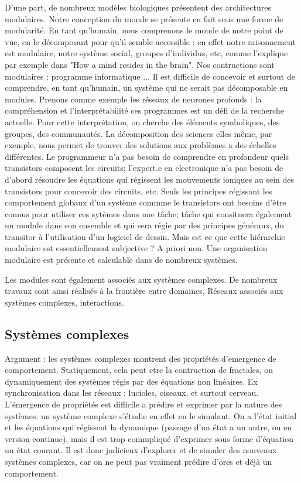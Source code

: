 D'une part, de nombreux modèles biologiques présentent des architectures modulaires. Notre conception du monde se présente en fait sous une forme de modularité. En tant qu'humain, nous comprenons le monde de notre point de vue, en le décomposant pour qu'il semble accessible : en effet notre raisonnement est modulaire, notre système social, groupes d'individus, etc, comme l'explique par exemple \cite{Morowitz1995TheMT} dans "How a mind resides in the brain".
Nos contructions sont modulaires : programme informatique ... Il est difficile de concevoir et surtout de comprendre, en tant qu'humain, un système qui ne serait pas décomposable en modules. Prenons comme exemple les réseaux de neurones profonds : la compréhension  et l'interprétabilité ces programmes est un défi de la recherche actuelle. Pour cette interprétation, on cherche des éléments symboliques, des groupes, des communautés. 
La décomposition des sciences elles même, par exemple, nous permet de trouver des solutions aux problèmes a des échelles différentes. Le programmeur n'a pas besoin de comprendre en profondeur quels transistors composent les circuits; l'expert.e en electronique n'a pas besoin de d'abord résoudre les équations qui régissent les mouvements ioniques au sein des transistors pour concevoir des circuits, etc. Seuls les principes régissant les comportement globaux d'un système commme le transistors ont besoins d'être connus pour utiliser ces sytèmes dans une tâche; tâche qui consituera également un module dans son ensemble et qui sera régie par des principes généraux, du transitor à l'utilisation d'un logiciel de dessin. 
Mais est ce que cette hiérarchie modulaire est essentiellement subjective ? A priori non. Une organisation modulaire est présente et calculable dans de nombreux systèmes.


Les modules sont également associés aux systèmes complexes. De nombreux travaux sont ainsi réalisés à la frontière entre domaines, 
Réseaux associés aux systèmes complexes, interactions.


\subsection{Systèmes complexes}

Argument : les systèmes complexes montrent des propriétés d’emergence de comportement. Statiquement, cela peut etre la contruction de fractales, ou dynamiquement des systèmes régis par des équations non linéaires. Ex synchronisation dans les réseaux : lucioles, oiseaux, et surtout cerveau. L’émergence de propriétés est difficile a prédire et exprimer par la nature des systèmes. un système complexe s’étudie en effet en le simulant. On a l’état initial et les équations qui régissent la dynamique (passage d’un état a un autre, ou en version continue), mais il est trop commpliqué d’exprimer sous forme d’équation un état courant. 
Il est donc judicieux d’explorer et de simuler des nouveaux systèmes complexes, car on ne peut pas vraiment prédire d’ores et déjà un comportement. 



